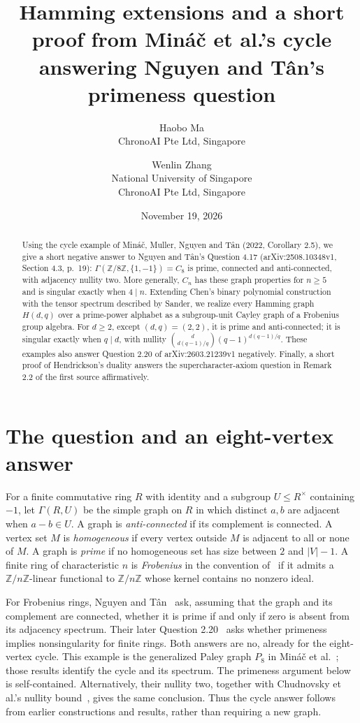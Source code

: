 \documentclass[10pt]{article}
\title{Hamming extensions and a short proof from Min\'a\v{c} et al.'s cycle\newline
answering Nguyen and T\^an's primeness question}
\author{Haobo Ma\\{\small ChronoAI Pte Ltd, Singapore}
\and Wenlin Zhang\\{\small National University of Singapore}\\
{\small ChronoAI Pte Ltd, Singapore}}
\date{November 19, 2026}
\begin{document}
\maketitle
\begin{abstract}
Using the cycle example of Min\'a\v{c}, Muller, Nguyen and T\^an
(2022, Corollary 2.5), we give a short negative answer to Nguyen and
T\^an's Question 4.17 (arXiv:2508.10348v1, Section 4.3, p.~19):
$\Gamma(\mathbb Z/8\mathbb Z,\{1,-1\})=C_8$ is prime, connected and
anti-connected, with adjacency nullity two. More generally, $C_n$ has
these graph properties for $n\geq5$ and is singular exactly when $4\mid n$.
Extending Chen's binary polynomial construction with the tensor spectrum
described by Sander, we realize every Hamming graph $H(d,q)$ over a
prime-power alphabet as a subgroup-unit Cayley graph of a Frobenius group
algebra. For $d\geq2$, except $(d,q)=(2,2)$, it is prime and
anti-connected; it is singular exactly when $q\mid d$, with nullity
$\binom d{d(q-1)/q}(q-1)^{d(q-1)/q}$.
These examples also answer Question 2.20 of arXiv:2603.21239v1 negatively.
Finally, a short proof of Hendrickson's duality answers the
supercharacter-axiom question in Remark 2.2 of the first source affirmatively.
\end{abstract}

\section{The question and an eight-vertex answer}
For a finite commutative ring $R$ with identity and a subgroup
$U\leq R^\times$ containing $-1$, let $\Gamma(R,U)$ be the simple
graph on $R$ in which distinct $a,b$ are adjacent when $a-b\in U$.
A graph is \emph{anti-connected} if its complement is connected.
A vertex set $M$ is \emph{homogeneous} if every vertex outside $M$
is adjacent to all or none of $M$. A graph is \emph{prime} if no
homogeneous set has size between $2$ and $|V|-1$.
A finite ring of characteristic $n$ is \emph{Frobenius} in the convention
of~\cite[Section 4.1]{NT} if it admits a $\mathbb Z/n\mathbb Z$-linear
functional to $\mathbb Z/n\mathbb Z$ whose kernel contains no nonzero ideal.

For Frobenius rings, Nguyen and T\^an~\cite[Question 4.17]{NT} ask,
assuming that the graph and its complement are connected, whether it is prime
if and only if zero is absent from its adjacency spectrum. Their later
Question 2.20~\cite[Section 2.2.4, p.~9]{NT26} asks whether primeness
implies nonsingularity for finite rings. Both answers are no, already
for the eight-vertex cycle. This example is the generalized Paley graph
$P_8$ in Min\'a\v{c} et al.~\cite[Corollary 2.5 and Theorem 3.5]{MMNT};
those results identify the cycle and its spectrum. The primeness
argument below is self-contained. Alternatively, their nullity two,
together with Chudnovsky et al.'s nullity bound~\cite[Corollary 4.3]{CC},
gives the same conclusion. Thus the cycle answer follows from earlier
constructions and results, rather than requiring a new graph.
\end{document}
